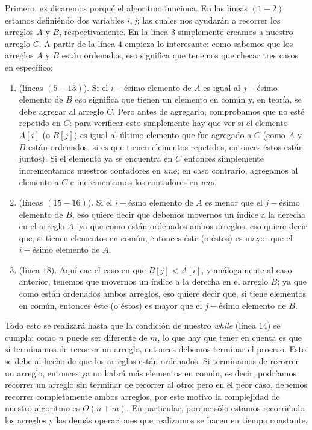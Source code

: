 \documentclass[letterpaper,11pt]{article}
\begin{document}
\begin{enumerate}
    Primero, explicaremos porqué el algoritmo funciona. En las líneas $(1 - 2)$ 
    estamos definiéndo dos variables $i, j$; las cuales nos ayudarán a recorrer
    los arreglos $A$ y $B$, respectivamente. En la línea $3$ simplemente creamos 
    a nuestro arreglo $C$. A partir de la línea $4$ empieza lo interesante: como
    sabemos que los arreglos $A$ y $B$ están ordenados, eso significa que 
    tenemos que checar tres casos en específico:
    \begin{enumerate}
        \item (líneas $(5 - 13)$). Si el $i-$ésimo elemento de $A$ es igual al 
        $j-$ésimo elemento de $B$ eso significa que tienen un elemento en común 
        y, en teoría, se debe agregar al arreglo $C$. Pero antes de agregarlo,
        comprobamos que no esté repetido en $C$: para verificar esto simplemente
        hay que ver si el elemento $A[i]$ (o $B[j]$) es igual al último elemento 
        que fue agregado a $C$ (como $A$ y $B$ están ordenados, si es que tienen 
        elementos repetidos, entonces éstos están juntos). Si el elemento ya se 
        encuentra en $C$ entonces simplemente incrementamos nuestros contadores 
        en \textit{uno}; en caso contrario, agregamos al elemento a $C$ e 
        incrementamos los contadores en \textit{uno}.

        \item (líneas $(15 - 16)$). Si el $i-$ésmo elemento de $A$ es menor que 
        el $j-$ésimo elemento de $B$, eso quiere decir que debemos movernos un 
        índice a la derecha en el arreglo $A$; ya que como están ordenados ambos 
        arreglos, eso quiere decir que, si tienen elementos en común, entonces 
        éste (o éstos) es mayor que el $i-$ésimo elemento de $A$.

        \newpage
        \item (línea $18$). Aquí cae el caso en que $B[j] < A[i]$, y 
        análogamente al caso anterior, tenemos que movernos un índice a la 
        derecha en el arreglo $B$; ya que como están ordenados ambos arreglos, 
        eso quiere decir que, si tiene elementos en común, entonces éste (o 
        éstos) es mayor que el $j-$ésimo elemento de $B$. 
    \end{enumerate} 

    Todo esto se realizará hasta que la condición de nuestro \textit{while} 
    (línea $14$) se cumpla: como $n$ puede ser diferente de $m$,
     lo que hay 
    que tener en cuenta es que si terminamos de recorrer un arreglo, entonces 
    debemos terminar el proceso. Esto se debe al hecho de que los arreglos
    están ordenados. Si terminamos de recorrer un arreglo, entonces ya no 
    habrá más elementos en común, es decir, podríamos recorrer un arreglo sin 
    terminar de recorrer al otro; pero en el peor caso, debemos recorrer 
    completamente ambos arreglos, por este motivo la complejidad de nuestro 
    algoritmo es $O(n + m)$. En particular, porque sólo estamos recorriéndo los 
    arreglos y las demás operaciones que realizamos se hacen en tiempo constante.


\end{enumerate}
\end{document}
